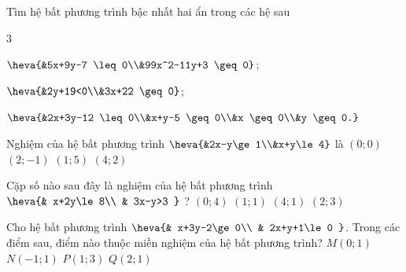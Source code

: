 \begin{bt}%
	Tìm hệ bất phương trình bậc nhất hai ẩn trong các hệ sau
	\begin{enumEX}{3}
		\item $\heva{&5x+9y-7 \leq 0\\&99x^2-11y+3 \geq 0}$;
		\item $\heva{&2y+19<0\\&3x+22 \geq 0}$;
		\item $\heva{&2x+3y-12 \leq 0\\&x+y-5 \geq 0\\&x \geq 0\\&y \geq 0.}$
	\end{enumEX}
\end{bt}

\begin{ex}%
	Nghiệm của hệ bất phương trình $\heva{&2x-y\ge 1\\&x+y\le 4}$ là
	\choice
		{$(0;0)$}
		{\True $(2;-1)$}
		{$(1;5)$}
		{$(4;2)$}
\end{ex}

\begin{ex}%
	Cặp số nào sau đây là nghiệm của hệ  bất phương trình $\heva{& x+2y\le8\\ & 3x-y>3 }$ ?
	\choice 
		 {$\left(0; 4\right)$ }
		 {$\left(1; 1\right)$}
		 {\True $\left(4; 1\right)$}
		{$\left(2;  3\right)$}
\end{ex}

\begin{ex}%
	Cho hệ bất phương trình $\heva{& x+3y-2\ge0\\ & 2x+y+1\le0 }$. Trong các điểm sau, điểm nào  thuộc miền nghiệm của hệ bất phương trình?
	\choice 
		{$M\left(0;1\right)$} 
		{\True  $N\left(-1;1\right)$}
		 {$P\left(1;3\right)$}
		{$Q\left(2;1\right)$} 
\end{ex}

